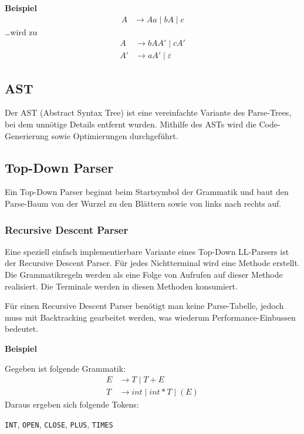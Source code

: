 \textbf{Beispiel}
%
\begin{align*}
	A &\rightarrow Aa \mid bA \mid c
\end{align*}
%
\ldots{wird} zu
%
\begin{align*}
	A  &\rightarrow bAA' \mid cA' \\
	A' &\rightarrow aA' \mid \varepsilon 
\end{align*}


\subsection{AST}

Der AST (Abstract Syntax Tree) ist eine vereinfachte Variante des Parse-Trees,
bei dem unnötige Details entfernt wurden. Mithilfe des ASTs wird die
Code-Generierung sowie Optimierungen durchgeführt.


\subsection{Top-Down Parser} 

Ein Top-Down Parser beginnt beim Startsymbol der Grammatik und baut den
Parse-Baum von der Wurzel zu den Blättern sowie von links nach rechts auf.

\subsubsection{Recursive Descent Parser}

Eine speziell einfach implementierbare Variante eines Top-Down LL-Parsers ist
der Recursive Descent Parser. Für jedes Nichtterminal wird eine Methode
erstellt. Die Grammatikregeln werden als eine Folge von Aufrufen auf dieser
Methode realisiert. Die Terminale werden in diesen Methoden konsumiert.

Für einen Recursive Descent Parser benötigt man keine Parse-Tabelle, jedoch muss
mit Backtracking gearbeitet werden, was wiederum Performance-Einbussen bedeutet.

\textbf{Beispiel}

Gegeben ist folgende Grammatik:
%
\begin{align*}
	E &\rightarrow T \mid T + E \\
	T &\rightarrow int \mid int * T \mid (E)
\end{align*}
%
Daraus ergeben sich folgende Tokens:

\texttt{INT}, \texttt{OPEN}, \texttt{CLOSE}, \texttt{PLUS}, \texttt{TIMES}

